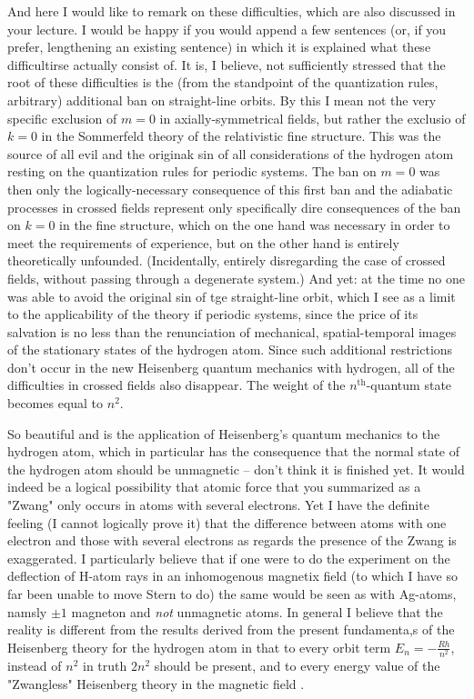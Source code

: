 And here I would like to remark on these difficulties, which are also discussed in your lecture. I would be happy if you would append a few sentences (or, if you prefer, lengthening an existing sentence) in which it is explained what these difficultirse actually consist of. It is, I believe, not sufficiently stressed that the root of these difficulties is the (from the standpoint of the quantization rules, arbitrary) additional ban on straight-line orbits. By this I mean not the very specific exclusion of $m=0$ in axially-symmetrical fields, but rather the exclusio of $k=0$ in the Sommerfeld theory of the relativistic fine structure. This was the source of all evil and the originak sin of all considerations of the hydrogen atom resting on the quantization rules for periodic systems. The ban on $m=0$ was then only the logically-necessary consequence of this first ban and the adiabatic processes in crossed fields represent only specifically dire consequences of the ban on $k=0$ in the fine structure, which on the one hand was necessary in order to meet the requirements of experience, but on the other hand is entirely theoretically unfounded. (Incidentally, entirely disregarding the case of crossed fields,  without passing through a degenerate system.) And yet: at the time no one was able to avoid the original sin of tge straight-line orbit, which I see as a limit to the applicability of the theory if periodic systems, since the price of its salvation is no less than the renunciation of mechanical, spatial-temporal images of the stationary states of the hydrogen atom. Since such additional restrictions don't occur in the new Heisenberg quantum mechanics with hydrogen, all of the difficulties in crossed fields also disappear. The weight of the $n^\text{th}$-quantum state becomes equal to $n^2$.

So beautiful and  is the application of Heisenberg's quantum mechanics to the hydrogen atom, which in particular has the consequence that the normal state of the hydrogen atom should be unmagnetic --  don't think it is finished yet. It would indeed be a logical possibility that atomic force that you summarized as a "Zwang" only occurs in atoms with several electrons. Yet I have the definite feeling (I cannot logically prove it) that the difference between atoms with one electron and those with several electrons as regards the presence of the Zwang is exaggerated. I particularly believe that if one were to do the experiment on the deflection of H-atom rays in an inhomogenous magnetix field (to which I have so far been unable to move Stern to do) the same would be seen as with Ag-atoms, namsly $\pm 1$ magneton and \textit{not} unmagnetic atoms. In general I believe that the reality is different from the results derived from the present fundamenta,s of the Heisenberg theory for the hydrogen atom in that to every orbit term $E_n=-\frac{Rh}{n^2}$, instead of $n^2$ in truth $2n^2$ should be present, and to every energy value of the "Zwangless" Heisenberg theory in the magnetic field .


